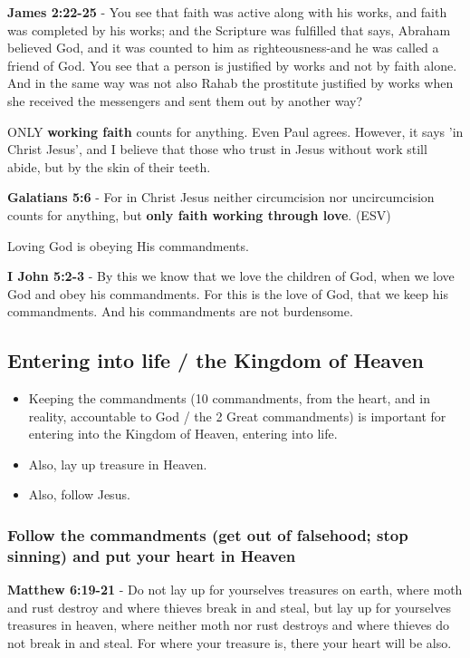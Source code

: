 \documentclass[11pt]{article}
\begin{document}
\textbf{James 2:22-25} - You see that faith was active along with his works, and faith was completed by his works; and the Scripture was fulfilled that says, Abraham believed God, and it was counted to him as righteousness-and he was called a friend of God. You see that a person is justified by works and not by faith alone. And in the same way was not also Rahab the prostitute justified by works when she received the messengers and sent them out by another way?

ONLY \textbf{working faith} counts for anything. Even Paul agrees. However, it says 'in Christ Jesus', and I believe that those who trust in Jesus without work still abide, but by the skin of their teeth.

\textbf{Galatians 5:6} - For in Christ Jesus neither circumcision nor uncircumcision counts for anything, but \textbf{only faith working through love}. (ESV)

Loving God is obeying His commandments.

\textbf{I John 5:2-3} - By this we know that we love the children of God, when we love God and obey his commandments. For this is the love of God, that we keep his commandments. And his commandments are not burdensome.

\subsection{Entering into life / the Kingdom of Heaven}
\label{sec:org7a4abe8}
\begin{itemize}
\item Keeping the commandments (10 commandments, from the heart, and in reality, accountable to God / the 2 Great commandments) is important for entering into the Kingdom of Heaven, entering into life.
\item Also, lay up treasure in Heaven.
\item Also, follow Jesus.
\end{itemize}

\subsubsection{Follow the commandments (get out of falsehood; stop sinning) and put your heart in Heaven}
\label{sec:org42b546c}
\textbf{Matthew 6:19-21} - Do not lay up for yourselves treasures on earth, where moth and rust destroy and where thieves break in and steal, but lay up for yourselves treasures in heaven, where neither moth nor rust destroys and where thieves do not break in and steal. For where your treasure is, there your heart will be also.
\end{document}
